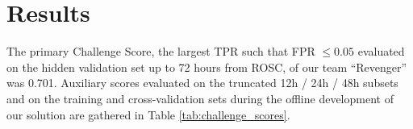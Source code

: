 \section{Results}
\label{sec:results}


The primary Challenge Score, the largest TPR such that FPR $\le 0.05$ evaluated on the hidden validation set up to 72 hours from ROSC, of our team ``Revenger'' was 0.701. Auxiliary scores evaluated on the truncated 12h / 24h / 48h subsets and on the training and cross-validation sets during the offline development of our solution are gathered in Table \ref{tab:challenge_scores}.


